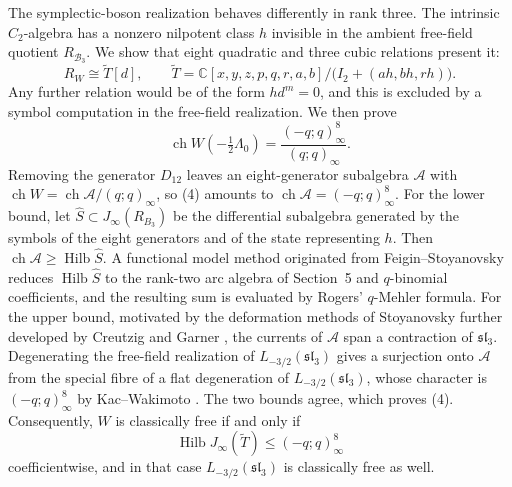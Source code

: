 \documentclass[11pt]{amsart}
\theoremstyle{definition}
\theoremstyle{remark}
\begin{document}
The symplectic-boson realization \cite{FF} behaves differently in rank
three. The intrinsic $C_2$-algebra has a nonzero nilpotent class $h$ invisible
in the ambient free-field quotient $R_{\mathcal{B}_3}$. 
We show that eight quadratic
and three cubic relations present it:
\[
R_W\cong\widetilde{T}[d],\qquad
\widetilde{T}=\mathbb{C}[x,y,z,p,q,r,a,b]/\bigl(I_2+(ah,bh,rh)\bigr).
\]
Any further relation would be of the form $hd^m=0$, and this is excluded by a symbol computation
in the free-field realization. We then prove
\begin{equation}
	\operatorname{ch}W(-\tfrac12\Lambda_0)=\frac{(-q;q)^8_\infty}{(q;q)_\infty}.
\end{equation}
Removing the generator $D_{12}$ leaves an eight-generator subalgebra $\mathcal{A}$ with
$\operatorname{ch}W=\operatorname{ch}\mathcal{A}/(q;q)_\infty$, so (4) amounts to
$\operatorname{ch}\mathcal{A}=(-q;q)^8_\infty$. For the lower bound, let
$\widehat{S}\subset J_\infty(R_{B_3})$ be the differential subalgebra generated by the symbols of
the eight generators and of the state representing $h$. Then
$\operatorname{ch}\mathcal{A}\ge\operatorname{Hilb}\widehat{S}$. A functional model method originated from Feigin--Stoyanovsky \cite{FS} reduces $\operatorname{Hilb}\widehat{S}$ to the rank-two arc
algebra of Section~5 and $q$-binomial coefficients, and the resulting sum is evaluated by Rogers' $q$-Mehler formula. For the upper bound, motivated by the
deformation methods of Stoyanovsky \cite{Stoy} further developed by Creutzig and Garner \cite{CG}, the currents of $\mathcal{A}$ span a contraction of
$\mathfrak{sl}_3$. Degenerating the free-field realization of $L_{-3/2}(\mathfrak{sl}_3)$
\cite{Ad16,ACG,BMR} gives a surjection onto $\mathcal{A}$ from the special fibre of a flat degeneration of
$L_{-3/2}(\mathfrak{sl}_3)$, whose character is $(-q;q)^8_\infty$ by Kac--Wakimoto \cite{KW}. The
two bounds agree, which proves (4). Consequently, $W$ is classically free if and only if
\[
\operatorname{Hilb}J_\infty(\widetilde{T})\le(-q;q)^8_\infty
\]
coefficientwise, and in that case $L_{-3/2}(\mathfrak{sl}_3)$ is classically free as well. 


\color{black}
\end{document}
